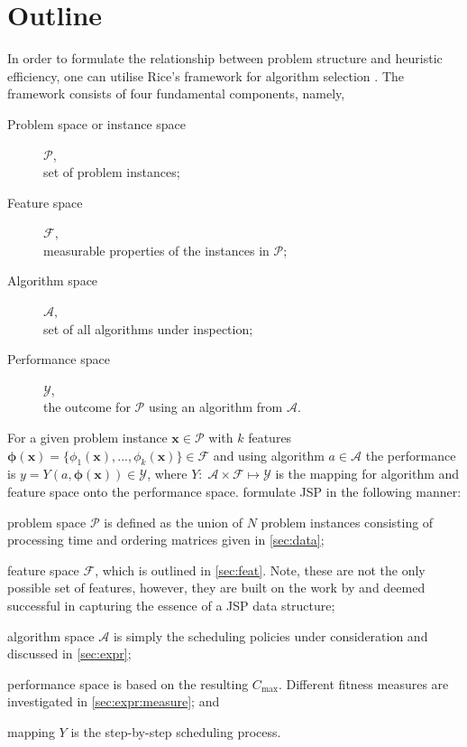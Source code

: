 \documentclass[graybox]{svmult}
\renewcommand{\vec}[1]{\mathbf{#1}}
\newcommand{\vphi}{{\boldsymbol{\phi}}}
\begin{document}
\section{Outline}
In order to formulate the relationship between problem structure and heuristic 
efficiency, one can utilise Rice's framework for algorithm selection  
\cite{Rice76}. The framework consists of four fundamental components, namely,
\begin{description}
\item[Problem space or instance space] $\mathcal{P}$, \hfill\\
    set of problem instances; 
\item[Feature space] $\mathcal{F}$, \hfill\\
    measurable properties of the instances in $\mathcal{P}$;
\item[Algorithm space] $\mathcal{A}$, \hfill\\
    set of all algorithms under inspection;
\item[Performance space] $\mathcal{Y}$, \hfill\\
    the outcome for $\mathcal{P}$ using an algorithm from $\mathcal{A}$.
\end{description}
For a given problem instance $\vec{x}\in\mathcal{P}$ with $k$ features 
$\vphi(\vec{x})=\{\phi_1(\vec{x}),...,\phi_k( \vec{x})\}\in\mathcal{F}$ and 
using algorithm $a\in\mathcal{A}$ the performance is 
$y=Y(a,\vphi(\vec{x}))\in\mathcal{Y}$, where $Y:\;\mathcal{A}\times\mathcal{F} 
\mapsto \mathcal{Y}$ is the mapping for algorithm and feature space onto the 
performance space. 
\cite{SmithMilesLion3,SmithMilesLion5,InRu12} formulate JSP in the following 
manner: 
\begin{inparaenum} 
\item problem space $\mathcal{P}$ is defined as the union of $N$ problem     
instances consisting of processing time and ordering matrices given in     
\cref{sec:data}; 
\item feature space $\mathcal{F}$, which is outlined in \cref{sec:feat}. 
Note, these are not the only possible set of features, however, they are built 
on the work by \cite{InRu11a,SmithMilesLion3} and deemed successful in 
capturing the essence of a JSP data structure;
\item algorithm space $\mathcal{A}$ is simply the scheduling policies under 
consideration and discussed in \cref{sec:expr};
\item performance space is based on the resulting $C_{\max}$. Different fitness 
measures are investigated in \cref{sec:expr:measure};
and \item mapping $Y$ is the step-by-step scheduling process. 
\end{inparaenum}
\end{document}
